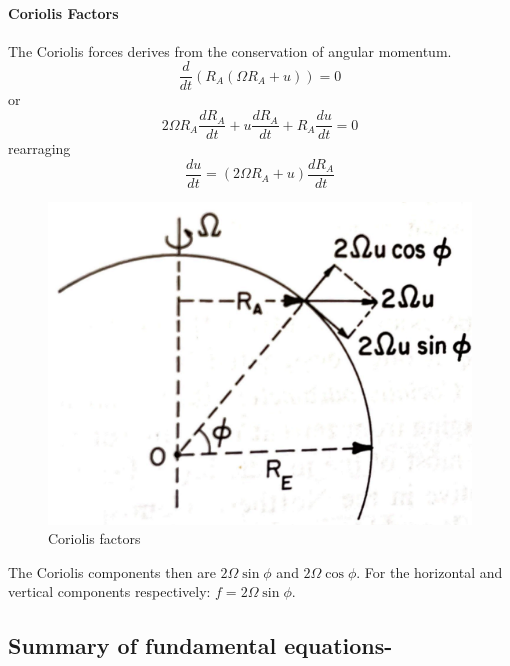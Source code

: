 \paragraph{Coriolis Factors}
The Coriolis forces derives from the conservation of angular momentum.
$$\frac{d}{dt}\left(R_A(\Omega R_A+u)\right)=0$$
or
$$2\Omega R_A\frac{dR_A}{dt}+u\frac{dR_A}{dt}+R_A\frac{du}{dt}=0$$
rearraging
$$\frac{du}{dt}=(2\Omega R_A+u)\frac{dR_A}{dt}$$
\begin{figure}[h!]
	\centering
	\includegraphics[width=0.35\linewidth]{uploads/Screenshot 2024-11-21 164025.png}
	\caption{Coriolis factors}
	\label{fig:coriolis}
\end{figure}
The Coriolis components then are $2\Omega\sin\phi$ and $2\Omega\cos\phi$. For the horizontal and vertical components respectively:
$f=2\Omega\sin\phi$.

\subsection{Summary of fundamental
	equations-}\label{summary-of-fundamental-equations}

